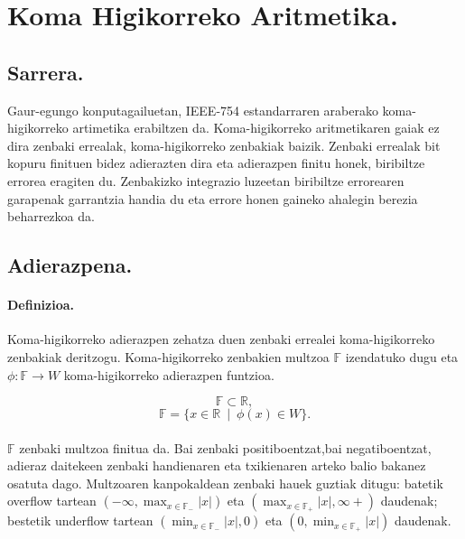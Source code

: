 \section{Koma Higikorreko Aritmetika.}

\subsection{Sarrera.}

Gaur-egungo konputagailuetan,  IEEE-754 estandarraren araberako koma-higikorreko artimetika erabiltzen da. Koma-higikorreko aritmetikaren gaiak ez dira zenbaki errealak, koma-higikorreko zenbakiak baizik. Zenbaki errealak bit kopuru finituen bidez adierazten dira eta adierazpen finitu honek, biribiltze errorea eragiten du. Zenbakizko integrazio luzeetan  biribiltze errorearen garapenak garrantzia handia du eta errore honen gaineko ahalegin berezia beharrezkoa da.    

\subsection{Adierazpena.}

\paragraph*{\textbf{Definizioa}.}  Koma-higikorreko adierazpen zehatza duen zenbaki errealei koma-higikorreko zenbakiak deritzogu. Koma-higikorreko zenbakien multzoa ${\mathbb{F}}$ izendatuko dugu eta $\phi:\mathbb{F} \rightarrow W$ koma-higikorreko adierazpen funtzioa. 

\begin{equation*}
\mathbb{F}\subset \mathbb{R},
\end{equation*}
\begin{equation}
\mathbb{F}=\{x \in \mathbb{R} \ \mid \ \phi(x) \in W\}.
\end{equation}

\paragraph*{}$\mathbb{F}$ zenbaki multzoa finitua da. Bai zenbaki positiboentzat,bai negatiboentzat, adieraz daitekeen zenbaki handienaren eta txikienaren arteko balio bakanez osatuta dago. Multzoaren kanpokaldean zenbaki hauek guztiak ditugu: batetik overflow tartean $(-\infty,\max_{x \in \mathbb{F_{-}}}|x|)$  eta $(\max_{x \in \mathbb{F_{+}}}|x|,\infty+)$ daudenak; bestetik underflow tartean  $(\min_{x \in \mathbb{F_{-}}}|x|,0)$ eta $(0,\min_{x \in \mathbb{F_{+}}}|x|)$ daudenak. 

